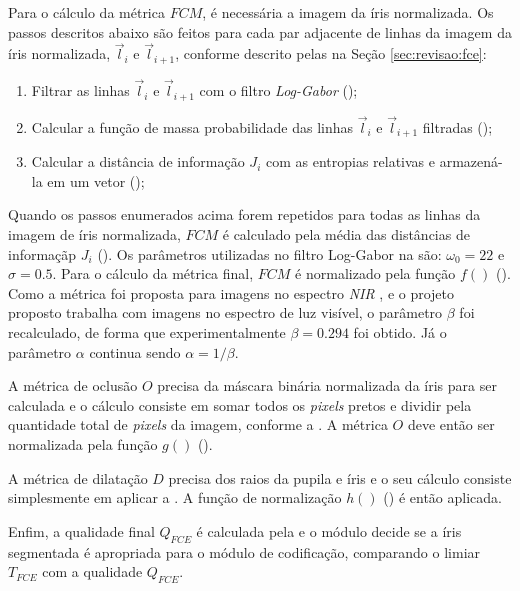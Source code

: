 \par Para o cálculo da métrica $FCM$, é necessária a imagem da íris normalizada. Os passos descritos abaixo são feitos para cada par adjacente de linhas da imagem da íris normalizada, $\vec{l}_{i}$ e $\vec{l}_{i+1}$, conforme descrito pelas  na Seção \ref{sec:revisao:fce}:

\begin{enumerate}
    \item Filtrar as linhas $\vec{l}_{i}$ e $\vec{l}_{i+1}$ com o filtro \textit{Log-Gabor} ();
    \item Calcular a função de massa probabilidade das linhas $\vec{l}_{i}$ e $\vec{l}_{i+1}$ filtradas ();
    \item Calcular a distância de informação $J_{i}$ com as entropias relativas e armazená-la em um vetor ();
\end{enumerate}

\par Quando os passos enumerados acima forem repetidos para todas as linhas da imagem de íris normalizada, $FCM$ é calculado pela média das distâncias de informaçãp $J_{i}$ (). Os parâmetros utilizadas no filtro Log-Gabor na  são: $\omega_{0} = 22$ e $\sigma = 0.5$. Para o cálculo da métrica final, $FCM$ é normalizado pela função $f()$ (). Como a métrica foi proposta para imagens no espectro \textit{NIR} \cite{du2010}, e o projeto proposto trabalha com imagens no espectro de luz visível, o parâmetro $\beta$ foi recalculado, de forma que experimentalmente $\beta = 0.294$ foi obtido. Já o parâmetro $\alpha$ continua sendo $\alpha = 1/\beta$.

\par A métrica de oclusão $O$ precisa da máscara binária normalizada da íris para ser calculada e o cálculo consiste em somar todos os \textit{pixels} pretos e dividir pela quantidade total de \textit{pixels} da imagem, conforme a . A métrica $O$ deve então ser normalizada pela função $g()$ ().

\par A métrica de dilatação $D$ precisa dos raios da pupila e íris e o seu cálculo consiste simplesmente em aplicar a . A função de normalização $h()$ () é então aplicada.

\par Enfim, a qualidade final $Q_{FCE}$ é calculada pela  e o módulo decide se a íris segmentada é apropriada para o módulo de codificação, comparando o limiar $T_{FCE}$ com a qualidade $Q_{FCE}$.

